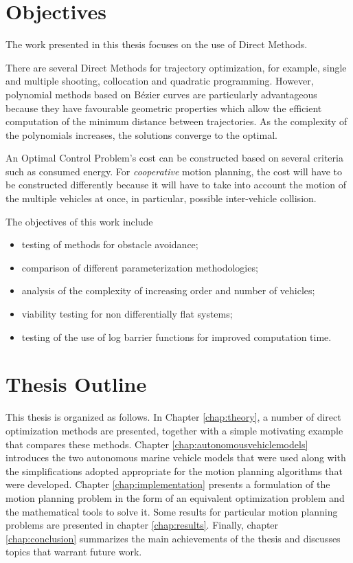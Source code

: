 \section{Objectives}

\par The work presented in this thesis focuses on the use of Direct Methods.
\par There are several Direct Methods for trajectory optimization, for example, single and multiple shooting, collocation and quadratic programming. However, polynomial methods based on Bézier curves are particularly advantageous because they have favourable geometric properties which allow the efficient computation of the minimum distance between trajectories. As the complexity of the polynomials increases, the solutions converge to the optimal. \cite{cichella2018bernstein}
\par An Optimal Control Problem's cost can be constructed based on several criteria such as consumed energy. For \textit{cooperative} motion planning, the cost will have to be constructed differently because it will have to take into account the motion of the multiple vehicles at once, in particular, possible inter-vehicle collision.
\par The objectives of this work include
\begin{itemize}
    \item testing of methods for obstacle avoidance;
    \item comparison of different parameterization methodologies;
    \item analysis of the complexity of increasing order and number of vehicles;
    \item viability testing for non differentially flat systems;
    \item testing of the use of log barrier functions for improved computation time.
\end{itemize}


\section{Thesis Outline}

This thesis is organized as follows.  In Chapter \ref{chap:theory}, a number of direct optimization methods are presented, together with a simple motivating example that compares these methods. Chapter \ref{chap:autonomousvehiclemodels} introduces the two autonomous marine vehicle models that were used along with the simplifications adopted appropriate for the motion planning algorithms that were developed. Chapter \ref{chap:implementation} presents a formulation of the motion planning problem in the form of an equivalent optimization problem and the mathematical tools to solve it. Some results for particular motion planning problems are presented in chapter \ref{chap:results}. Finally, chapter \ref{chap:conclusion} summarizes the main achievements of the thesis and discusses topics that warrant future work.

